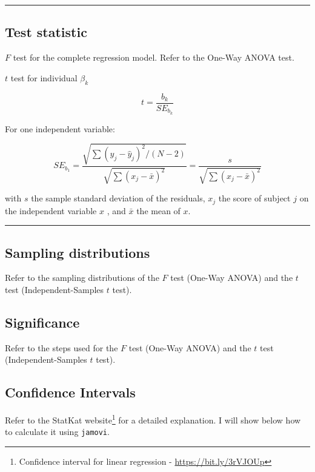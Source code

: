 \documentclass[
]{article}
\begin{document}
\begin{center}\rule{0.5\linewidth}{0.5pt}\end{center}

\hypertarget{test-statistic}{%
\subsection{Test statistic}\label{test-statistic}}

\(F\) test for the complete regression model. Refer to the One-Way ANOVA test.

\(t\) test for individual \(\beta_k\)

\[
t = \dfrac{b_k}{SE_{b_k}}
\]

For one independent variable:

\[
SE_{b_1} = \dfrac{\sqrt{\sum (y_j - \hat{y}_j)^2 / (N - 2)}}{\sqrt{\sum (x_j - \bar{x})^2}} = \dfrac{s}{\sqrt{\sum (x_j - \bar{x})^2}}
\]

with \(s\) the sample standard deviation of the residuals, \(x_j\) the score of subject \(j\) on the independent variable \(x\) , and \(\bar{x}\) the mean of \(x\).

\begin{center}\rule{0.5\linewidth}{0.5pt}\end{center}

\hypertarget{sampling-distributions}{%
\subsection{Sampling distributions}\label{sampling-distributions}}

Refer to the sampling distributions of the \(F\) test (One-Way ANOVA) and the \(t\) test (Independent-Samples \(t\) test).

\hypertarget{significance}{%
\subsection{Significance}\label{significance}}

Refer to the steps used for the \(F\) test (One-Way ANOVA) and the \(t\) test (Independent-Samples \(t\) test).

\hypertarget{confidence-intervals}{%
\subsection{Confidence Intervals}\label{confidence-intervals}}

Refer to the StatKat website\footnote{Confidence interval for linear regression - \url{https://bit.ly/3rVJOUp}} for a detailed explanation. I will show below how to calculate it using \texttt{jamovi}.
\end{document}

